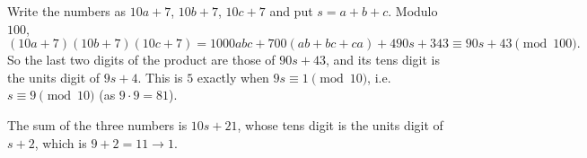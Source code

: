Write the numbers as $10a+7$, $10b+7$, $10c+7$ and put $s=a+b+c$. Modulo $100$,
\[(10a+7)(10b+7)(10c+7)=1000abc+700(ab+bc+ca)+490s+343\equiv90s+43\pmod{100}.\]
So the last two digits of the product are those of $90s+43$, and its tens digit is the units digit of $9s+4$. This is $5$ exactly when $9s\equiv1\pmod{10}$, i.e. $s\equiv9\pmod{10}$ (as $9\cdot9=81$).

The sum of the three numbers is $10s+21$, whose tens digit is the units digit of $s+2$, which is $9+2=11\to\boxed{1}$.
